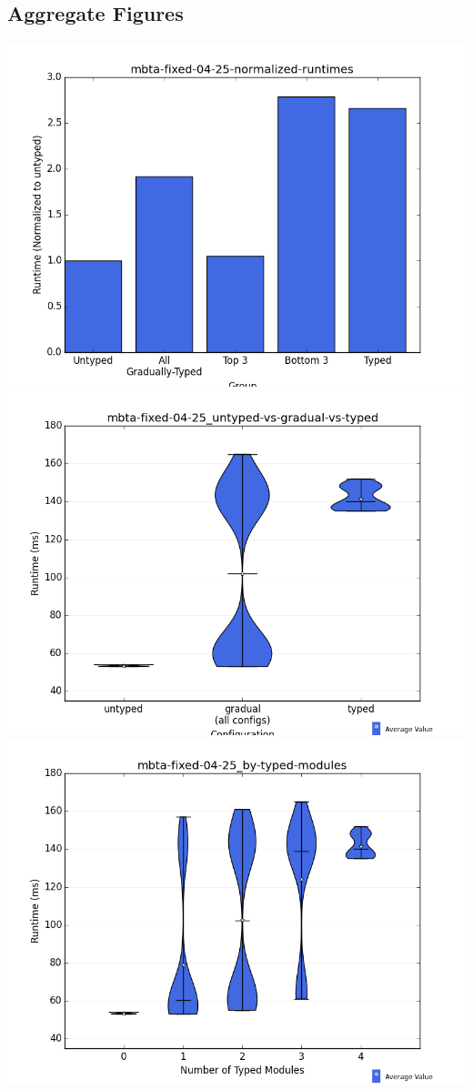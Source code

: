 \documentclass{article}
\begin{document}
\subsection{Aggregate Figures}
\includegraphics[width=\textwidth]{mbta-fixed-04-25-normalized-runtimes-bar.png}
\includegraphics[width=\textwidth]{mbta-fixed-04-25_untyped-vs-gradual-vs-typed-violin.png}
\includegraphics[width=\textwidth]{mbta-fixed-04-25_by-typed-modules-violin.png}
\end{document}
